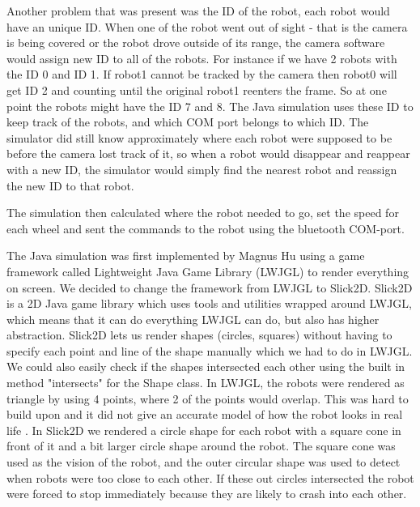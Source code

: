 Another problem that was present was the ID of the robot, each robot would have an unique ID. When one of the robot went out of sight - that is the camera is being covered or the robot drove outside of its range, the camera software would assign new ID to all of the robots. For instance if we have 2 robots with the ID 0 and ID 1. If robot1 cannot be tracked by the camera then robot0 will get ID 2 and counting until the original robot1 reenters the frame. So at one point the robots might have the ID 7 and 8. The Java simulation uses these ID to keep track of the robots, and which COM port belongs to which ID. The simulator did still know approximately where each robot were supposed to be before the camera lost track of it, so when a robot would disappear and reappear with a new ID, the simulator would simply find the nearest robot and reassign the new ID to that robot.

The simulation then calculated where the robot needed to go, set the speed for each wheel and sent the commands to the robot using the bluetooth COM-port.

The Java simulation was first implemented by Magnus Hu using a game framework called Lightweight Java Game Library (LWJGL) to render everything on screen. We decided to change the framework from LWJGL to Slick2D. Slick2D is a 2D Java game library which uses tools and utilities wrapped around LWJGL, which means that it can do everything LWJGL can do, but also has higher abstraction. Slick2D lets us render shapes (circles, squares) without having to specify each point and line of the shape manually which we had to do in LWJGL. We could also easily check if the shapes intersected each other using the built in method "intersects" for the Shape class. In LWJGL, the robots were rendered as triangle by using 4 points, where 2 of the points would overlap. This was hard to build upon and it did not give an accurate model of how the robot looks in real life .
In Slick2D we rendered a circle shape for each robot with a square cone in front of it and a bit larger circle shape around the robot. The square cone was used as the vision of the robot, and the outer circular shape was used to detect when robots were too close to each other. If these out circles intersected the robot were forced to stop immediately because they are likely to crash into each other.\\


